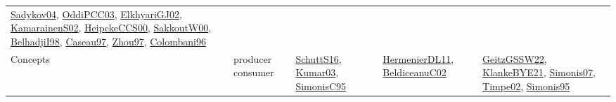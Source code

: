 {\begin{longtable}{llp{6cm}p{6cm}p{6cm}}
\href{papers/Sadykov04.pdf}{Sadykov04}\cite{Sadykov04}, \href{papers/OddiPCC03.pdf}{OddiPCC03}\cite{OddiPCC03}, \href{papers/ElkhyariGJ02.pdf}{ElkhyariGJ02}\cite{ElkhyariGJ02}, \href{papers/KamarainenS02.pdf}{KamarainenS02}\cite{KamarainenS02}, \href{articles/HeipckeCCS00.pdf}{HeipckeCCS00}\cite{HeipckeCCS00}, \href{articles/SakkoutW00.pdf}{SakkoutW00}\cite{SakkoutW00}, \href{articles/BelhadjiI98.pdf}{BelhadjiI98}\cite{BelhadjiI98}, \href{papers/Caseau97.pdf}{Caseau97}\cite{Caseau97}, \href{articles/Zhou97.pdf}{Zhou97}\cite{Zhou97}, \href{papers/Colombani96.pdf}{Colombani96}\cite{Colombani96}\\
Concepts & producer consumer & \href{papers/SchuttS16.pdf}{SchuttS16}\cite{SchuttS16}, \href{papers/Kumar03.pdf}{Kumar03}\cite{Kumar03}, \href{papers/SimonisC95.pdf}{SimonisC95}\cite{SimonisC95} & \href{papers/HermenierDL11.pdf}{HermenierDL11}\cite{HermenierDL11}, \href{papers/BeldiceanuC02.pdf}{BeldiceanuC02}\cite{BeldiceanuC02} & \href{papers/GeitzGSSW22.pdf}{GeitzGSSW22}\cite{GeitzGSSW22}, \href{papers/KlankeBYE21.pdf}{KlankeBYE21}\cite{KlankeBYE21}, \href{articles/Simonis07.pdf}{Simonis07}\cite{Simonis07}, \href{articles/Timpe02.pdf}{Timpe02}\cite{Timpe02}, \href{papers/Simonis95.pdf}{Simonis95}\cite{Simonis95}\\

\end{longtable}}

